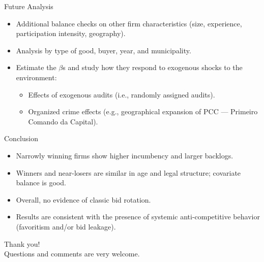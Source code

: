 \documentclass{beamer}
\begin{document}

\begin{frame}{Future Analysis}
\begin{itemize}
  \item Additional balance checks on other firm characteristics (size, experience, participation intensity, geography).
  \item Analysis by type of good, buyer, year, and municipality. \vspace{2mm}
  \item Estimate the $\beta$s and study how they respond to exogenous shocks to the environment:
  \begin{itemize}
    \item Effects of exogenous audits (i.e., randomly assigned audits).
    \item Organized crime effects (e.g., geographical expansion of PCC --- Primeiro Comando da Capital).
  \end{itemize}
\end{itemize}
\end{frame}


\begin{frame}{Conclusion}
  \begin{itemize}
    \item Narrowly winning firms show higher incumbency and larger backlogs.
    \item Winners and near-losers are similar in age and legal structure; covariate balance is good.
    \item Overall, no evidence of classic bid rotation.
    \item Results are consistent with the presence of systemic anti-competitive behavior (favoritism and/or bid leakage).
  \end{itemize}
\end{frame}

\begin{frame}
  \begin{center}
    \Huge Thank you! \\[8pt]
    \large Questions and comments are very welcome.
  \end{center}
\end{frame}
\end{document}
